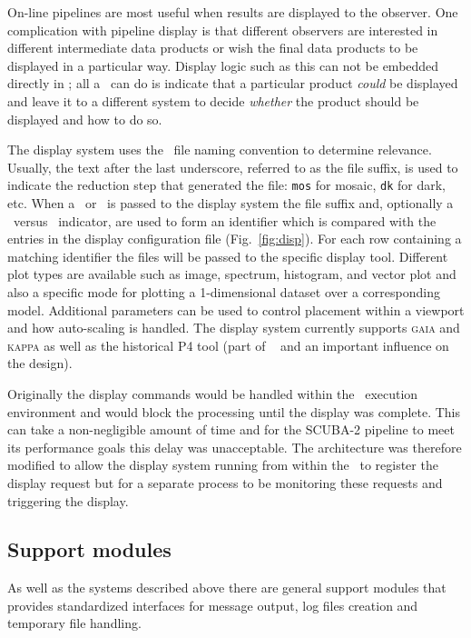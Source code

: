 \documentclass[final,authoryear,5p,times,twocolumn]{elsarticle}
\begin{document}
On-line pipelines are most useful when results are displayed to the
observer. One complication with pipeline display is that different
observers are interested in different intermediate data products or
wish the final data products to be displayed in a particular
way. Display logic such as this can not be embedded directly in
\primitives; all a \primitive\ can do is indicate that a particular
product \emph{could} be displayed and leave it to a different system
to decide \emph{whether} the product should be displayed and how to
do so.

The display system uses the \oracdr\ file naming convention to
determine relevance. Usually, the text after the last underscore,
referred to as the file suffix, is used to indicate the reduction step
that generated the file: \texttt{mos} for mosaic, \texttt{dk} for
dark, etc. When a \Frame\ or \Group\ is passed to the display system
the file suffix and, optionally a \Group\ versus \Frame\ indicator,
are used to form an identifier which is compared with the entries in
the display configuration file (Fig.\ \ref{fig:disp}). For each row
containing a matching identifier the files will be passed to the
specific display tool. Different plot types are available such as
image, spectrum, histogram, and vector plot and also a specific mode
for plotting a 1-dimensional dataset over a corresponding model. Additional
parameters can be used to control placement within a viewport and how
auto-scaling is handled. The display system currently supports \textsc{gaia}
\citep[][]{2009ASPC..411..575D} and \textsc{kappa}
\citep[][]{SUN95} as well as the historical P4 tool
(part of \cgsdr\ \citep{SUN27} and an important influence on the
design).

Originally the display commands would be handled within the \recipe\
execution environment and would block the processing until the display
was complete. This can take a non-negligible amount of time and for the
SCUBA-2 pipeline to meet its performance goals this delay was
unacceptable. The architecture was therefore modified to allow the
display system running from within the \recipe\ to register the
display request but for a separate process to be monitoring these
requests and triggering the display.

\subsection{Support modules}

As well as the systems described above there are general support
modules that provides standardized interfaces for message output, log files
creation and temporary file handling.
\end{document}
